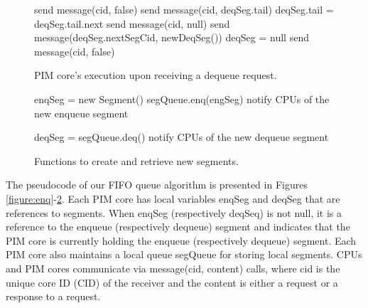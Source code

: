 \begin{figure}
\begin{algorithm}[H]
\Begin
{
    {
        send message(cid, false)\;
    }
    {
        {
			send message(cid, deqSeg.tail)\;
            deqSeg.tail = deqSeg.tail.next\;   
        }
        {
			{
				send message(cid, null)\;
			}
            {
                send message(deqSeg.nextSegCid, newDeqSeg())\;
                deqSeg = null\;
                send message(cid, false)\;
            }            
        }
    }
}
\end{algorithm}
\caption{PIM core's execution upon receiving a dequeue request.}
\label{figure:deq}
\end{figure}

\begin{figure}
\begin{algorithm}[H]
\Begin
{
    enqSeg = new Segment() \;
    segQueue.enq(engSeg) \;
    notify CPUs of the new enqueue segment\;
}
\end{algorithm}

\begin{algorithm}[H]
\Begin
{
    deqSeg = segQueue.deq() \;
    notify CPUs of the new dequeue segment\;
}
\end{algorithm}	
\caption{Functions to create and retrieve new segments.}
\label{figure:newSegment}
\end{figure}

The pseudocode of our FIFO queue algorithm is presented in 
Figures \ref{figure:enq}-\ref{figure:newSegment}. 
Each PIM core has local variables enqSeg and deqSeg that are references to segments.
When enqSeg (respectively deqSeq) is not null, it is a reference to the enqueue 
(respectively dequeue) segment and indicates that the PIM core is currently holding 
the enqueue (respectively dequeue) segment.
Each PIM core also maintains a local queue segQueue for storing local segments.
CPUs and PIM cores communicate via message(cid, content) calls, where cid is the unique core ID (CID) 
of the receiver and the content is either a request or a response to a request.

